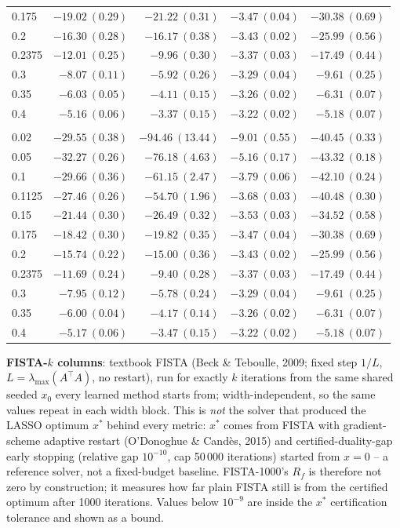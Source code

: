 \begin{table}[htbp]
\begin{tabular}{@{} l rrrr @{}}
0.175 & $-19.02\ (0.29)$ & $-21.22\ (0.31)$ & $-3.47\ (0.04)$ & $-30.38\ (0.69)$ \\
0.2 & $-16.30\ (0.28)$ & $-16.17\ (0.38)$ & $-3.43\ (0.02)$ & $-25.99\ (0.56)$ \\
0.2375 & $-12.01\ (0.25)$ & $-9.96\ (0.30)$ & $-3.37\ (0.03)$ & $-17.49\ (0.44)$ \\
0.3 & $-8.07\ (0.11)$ & $-5.92\ (0.26)$ & $-3.29\ (0.04)$ & $-9.61\ (0.25)$ \\
0.35 & $-6.03\ (0.05)$ & $-4.11\ (0.15)$ & $-3.26\ (0.02)$ & $-6.31\ (0.07)$ \\
0.4 & $-5.16\ (0.06)$ & $-3.37\ (0.15)$ & $-3.22\ (0.02)$ & $-5.18\ (0.07)$ \\
\addlinespace
\multicolumn{5}{@{}l}{\textit{Wide ($p \sim \mathcal{U}(0.05, 0.3)$)}} \\
0.02 & $-29.55\ (0.38)$ & $-94.46\ (13.44)$ & $-9.01\ (0.55)$ & $-40.45\ (0.33)$ \\
0.05 & $-32.27\ (0.26)$ & $-76.18\ (4.63)$ & $-5.16\ (0.17)$ & $-43.32\ (0.18)$ \\
0.1 & $-29.66\ (0.36)$ & $-61.15\ (2.47)$ & $-3.79\ (0.06)$ & $-42.10\ (0.24)$ \\
0.1125 & $-27.46\ (0.26)$ & $-54.70\ (1.96)$ & $-3.68\ (0.03)$ & $-40.48\ (0.30)$ \\
0.15 & $-21.44\ (0.30)$ & $-26.49\ (0.32)$ & $-3.53\ (0.03)$ & $-34.52\ (0.58)$ \\
0.175 & $-18.42\ (0.30)$ & $-19.82\ (0.35)$ & $-3.47\ (0.04)$ & $-30.38\ (0.69)$ \\
0.2 & $-15.74\ (0.22)$ & $-15.00\ (0.36)$ & $-3.43\ (0.02)$ & $-25.99\ (0.56)$ \\
0.2375 & $-11.69\ (0.24)$ & $-9.40\ (0.28)$ & $-3.37\ (0.03)$ & $-17.49\ (0.44)$ \\
0.3 & $-7.95\ (0.12)$ & $-5.78\ (0.24)$ & $-3.29\ (0.04)$ & $-9.61\ (0.25)$ \\
0.35 & $-6.00\ (0.04)$ & $-4.17\ (0.14)$ & $-3.26\ (0.02)$ & $-6.31\ (0.07)$ \\
0.4 & $-5.17\ (0.06)$ & $-3.47\ (0.15)$ & $-3.22\ (0.02)$ & $-5.18\ (0.07)$ \\
\bottomrule
\end{tabular}
\vspace{2pt}
\begin{minipage}{\linewidth}\footnotesize
\textbf{FISTA-$k$ columns}: textbook FISTA (Beck \& Teboulle, 2009; fixed step $1/L$, $L = \lambda_{\max}(A^\top A)$, no restart), run for exactly $k$ iterations from the same shared seeded $x_0$ every learned method starts from; width-independent, so the same values repeat in each width block. This is \emph{not} the solver that produced the LASSO optimum $x^*$ behind every metric: $x^*$ comes from FISTA with gradient-scheme adaptive restart (O'Donoghue \& Cand\`es, 2015) and certified-duality-gap early stopping (relative gap $10^{-10}$, cap 50\,000 iterations) started from $x = 0$ -- a reference solver, not a fixed-budget baseline. FISTA-1000's $R_f$ is therefore not zero by construction; it measures how far plain FISTA still is from the certified optimum after 1000 iterations. Values below $10^{-9}$ are inside the $x^*$ certification tolerance and shown as a bound.

\end{minipage}
\end{table}
